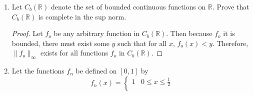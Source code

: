 \documentclass{article}
\begin{document}
\begin{enumerate}
\begin{enumerate}
\begin{proof}
\[                                    \rvert \leq \lVert f-g\rVert_\infty.
                              \]
                        \end{proof}
                  \item Suppose that $f_n\to f$ in the sup norm. Prove
                        that $\lVert f_n\rVert_\infty\to\lVert f\rVert_\infty$.
                        \begin{proof}
                              Let $\varepsilon>0$ be given.
                              We know that $f_n\to f$ in the sup norm, so there
                              must exist some $N$ such that for all $n>N$,
                              \begin{equation}
                                    \lVert f_n-f\rVert_\infty<\varepsilon.
                                    \label{eq:5.3_2b_convergence}
                              \end{equation}
                              Using \eqref{eq:5.3_2b_convergence}, and the proposition
                              from part (a), it is clear that
                              \begin{align*}
                                    \lvert\lVert f_n\rVert_\infty-\lVert f\rVert_\infty\rvert & \leq \lVert f_n-f\rVert_\infty \\
                                                                                              & < \varepsilon.
                              \end{align*}
                              Therefore, $\lVert f_n\rVert_\infty\to\lVert f\rVert_\infty$.

                        \end{proof}
            \end{enumerate}
      \item Let $C_b(\mathbb{R})$ denote the set of bounded continuous functions
            on $\mathbb{R}$. Prove that $C_b(\mathbb{R})$ is complete in the sup
            norm.
            \begin{proof}
                  Let $f_o$ be any arbitrary function in $C_b(\mathbb{R})$. Then
                  because $f_o$ it is bounded, there must exist some $y$ such that
                  for all $x$, $f_o(x)<y$. Therefore, $\lVert f_o\rVert_\infty$
                  exists for all functions $f_o$ in $C_b(\mathbb{R})$.
            \end{proof}
            \setcounter{enumi}{4}
      \item Let the functions $f_n$ be defined on $[0,1]$ by
            \begin{equation}
                  f_n(x)=\begin{cases}
                        1
                         & 0\leq x \leq \frac{1}{2}                     \\


\end{cases}
\end{equation}
\end{enumerate}
\end{document}
